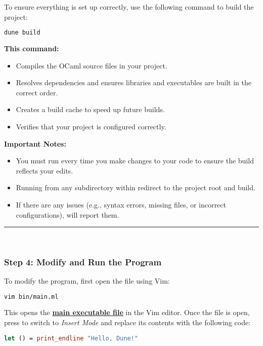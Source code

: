 To ensure everything is set up correctly, use the following command to build the project:

\begin{lstlisting}[language=Bash, caption={Building the Project}]
    dune build
\end{lstlisting}

\noindent
\textbf{This command:}
\begin{itemize}
    \item Compiles the OCaml source files in your project.
    \item Resolves dependencies and ensures libraries and executables are built in the correct order.
    \item Creates a build cache to speed up future builds.
    \item Verifies that your project is configured correctly.
\end{itemize}

\noindent
\textbf{Important Notes:}
\begin{itemize}
    \item You must run  every time you make changes to your code to ensure the build reflects your edits.
    \item Running  from any subdirectory within redirect to the project root and build.
    \item If there are any issues (e.g., syntax errors, missing files, or incorrect configurations),  will report them.
\end{itemize}

\noindent
\rule{\textwidth}{0.4pt}\\
\subsubsection{Step 4: Modify and Run the Program}

\noindent
To modify the program, first open the file  using Vim:

\begin{lstlisting}[language=Bash, caption={Opening the File in Vim}]
    vim bin/main.ml
\end{lstlisting}

\noindent
This opens the \underline{\textbf{main executable file}} in the Vim editor. Once the file is open, press  to switch to \textit{Insert Mode} and replace its contents with the following code:

\begin{lstlisting}[language=OCaml, caption={Hello, Dune Program}]
    let () = print_endline "Hello, Dune!"
\end{lstlisting}

